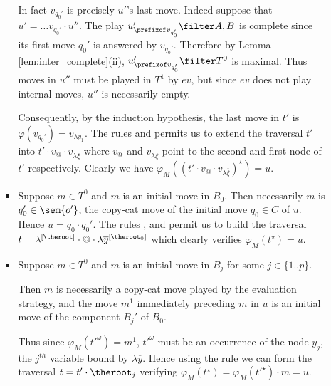 \begin{itemize}[$\bullet$]
\begin{enumerate}
\begin{itemize}
    In fact $v_{q_0'}$ is precisely $u'$'s last move. Indeed
    suppose that $u' = \ldots v_{q_0'} \cdot u''$. The play
    $u'_{\prefixof v_{q_0'}}\filter A,B$ is complete since its
    first move $q_0'$ is answered by $v_{q_0'}$. Therefore by
    Lemma \ref{lem:inter_complete}(ii), $u'_{\prefixof
    v_{q_0'}}\filter T^0$ is maximal. Thus moves in $u''$ must
    be played in $T^1$ by $ev$, but since $ev$ does not play internal
    moves, $u''$ is necessarily empty.

    Consequently, by the induction hypothesis, the last move in $t'$ is $\varphi(v_{q_0'}) = v_{\lambda y_1}$.
    The rules  and  permits us to extend
    the traversal $t'$ into $t' \cdot v_@ \cdot v_{\lambda \overline{\xi}}$ where $v_@$ and $v_{\lambda
    \overline{\xi}}$ point to the second and first node of $t'$ respectively. Clearly we have $\varphi_M((t'\cdot v_@ \cdot v_{\lambda \overline{\xi}})^\star) = u$.

    \item Suppose $m\in T^0$ and $m$ is an initial move in $B_0$.
    Then necessarily $m$ is $q_0' \in \sem{o'}$, the copy-cat move of the initial move $q_0 \in C$ of $u$. Hence $u = q_0 \cdot q_0'$. The rules , 
and  permit us to build the traversal $t =
\lambda^{[\theroot]} \cdot @ \cdot \lambda
\overline{y}^{[\theroot_0]}$ which clearly verifies
$\varphi_M(t^\star) = u$.

    \item Suppose $m\in T^0$ and $m$ is an initial move in $B_j$ for some $j\in \{1..p\}$.

    Then $m$ is necessarily a copy-cat move played by the evaluation strategy, and the move $m^1$ immediately preceding $m$ in $u$
is an initial move of the component $B_j'$ of $B_0$.

Thus since $\varphi_M(t'^\omega) = m^1$, $t'^\omega$ must be an occurrence of the node $y_j$, the $j^{th}$ variable bound by
$\lambda \overline{y}$. Hence using the rule  we can form the traversal $t= t' \cdot \theroot_j$ verifying
$\varphi_M(t^\star) = \varphi_M(t'^\star) \cdot m = u$.



\end{itemize}
\end{enumerate}
\end{itemize}

